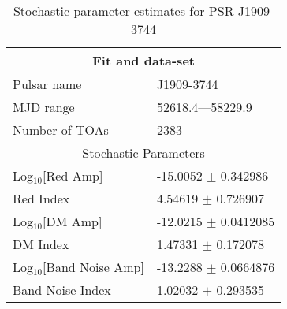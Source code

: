 \documentclass{article}
\begin{document}
\begin{table*}
\caption{Stochastic parameter estimates for PSR J1909-3744}
\begin{tabular}{ll}
\hline\hline
\multicolumn{2}{c}{Fit and data-set} \\ 
\hline
Pulsar name\dotfill & J1909-3744 \\ 
MJD range\dotfill & 52618.4---58229.9 \\ 
Number of TOAs\dotfill & 2383 \\
\hline
\multicolumn{2}{c}{Stochastic Parameters} \\ 
\hline
Log$_{10}$[Red Amp] \dotfill & -15.0052 $\pm$ 0.342986  \\ 
Red Index \dotfill & 4.54619 $\pm$ 0.726907  \\ 
Log$_{10}$[DM Amp] \dotfill & -12.0215 $\pm$ 0.0412085  \\ 
DM Index \dotfill & 1.47331 $\pm$ 0.172078  \\ 
Log$_{10}$[Band Noise Amp] \dotfill & -13.2288 $\pm$ 0.0664876  \\ 
Band Noise Index \dotfill & 1.02032 $\pm$ 0.293535  \\ 
\hline
\end{tabular}
\label{Table:J1909-3744}
\end{table*} 
\end{document}

